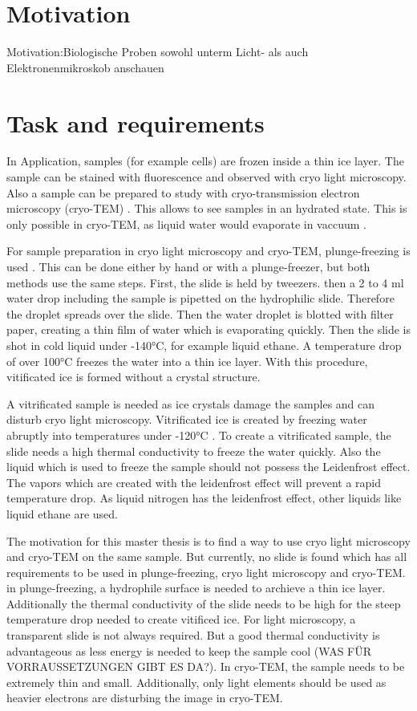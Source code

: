 
\section{Motivation}
Motivation:Biologische Proben sowohl unterm Licht- als auch Elektronenmikroskob anschauen

\section{Task and requirements}

In Application, samples (for example cells) are frozen inside a thin ice layer. The sample can be stained with fluorescence and observed with cryo light microscopy. Also a sample can be prepared to study with cryo-transmission electron microscopy (cryo-TEM) . This allows to see samples in an hydrated state. This is only possible in cryo-TEM, as liquid water would evaporate in vaccuum \cite{Danino.2012}.

For sample preparation in cryo light microscopy and cryo-TEM, plunge-freezing is used \cite{Danino.2012} \cite{Faoro.2018}. This can be done either by hand or with a plunge-freezer, but both methods use the same steps. First, the slide is held by tweezers. then a 2 to 4 ml water drop including the sample is pipetted on the hydrophilic slide. Therefore the droplet spreads over the slide. Then the water droplet is blotted with filter paper, creating a thin film of water which is evaporating quickly. Then the slide is shot in cold liquid under -140°C, for example liquid ethane. A temperature drop of over 100°C freezes the water into a thin ice layer. With this procedure, vitificated ice is formed without a crystal structure.

A vitrificated sample is needed as ice crystals damage the samples and can disturb cryo light microscopy. Vitrificated ice is created by freezing water abruptly into temperatures under -120°C \cite{Wowk.2010}. To create a vitrificated sample, the slide needs a high thermal conductivity to freeze the water quickly. Also the liquid which is used to freeze the sample should not possess the Leidenfrost effect. The vapors which are created with the leidenfrost effect will prevent a rapid temperature drop. As liquid nitrogen has the leidenfrost effect, other liquids like liquid ethane are used.

The motivation for this master thesis is to find a way to use cryo light microscopy and cryo-TEM on the same sample. But currently, no slide is found which has all requirements to be used in plunge-freezing, cryo light microscopy and cryo-TEM. in plunge-freezing, a hydrophile surface is needed to archieve a thin ice layer. Additionally the thermal conductivity of the slide needs to be high for the steep temperature drop needed to create vitificed ice. For light microscopy, a transparent slide is not always required. But a good thermal conductivity is advantageous as less energy is needed to keep the sample cool (WAS FÜR VORRAUSSETZUNGEN GIBT ES DA?). In cryo-TEM, the sample needs to be extremely thin and small. Additionally, only light elements should be used as heavier electrons are disturbing the image in cryo-TEM.


